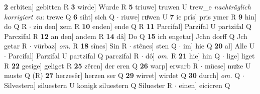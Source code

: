 \documentclass[8pt,a4paper,notitlepage]{article}
\begin{document}
\begin{table}[ht]
\begin{minipage}[t]{0.5\linewidth}
\textbf{2} erbiten] gebitten R \textbf{3} wirde] Wurde R \textbf{5} triuwe] truwen U trew_e \textit{nachträglich korrigiert zu:} trewe Q \textbf{6} siht] sich Q  $\cdot$ riuwe] ruͦwen U \textbf{7} ie prîs] pris ymer R \textbf{9} hin] do Q R  $\cdot$ zin den] zem R \textbf{10} enden] ende Q R \textbf{11} Parcifal] Parzifal U partzifal Q Parczifal R \textbf{12} an den] andem R \textbf{14} dâ] Do Q \textbf{15} ich engetar] Jchn dorff Q Jch getar R  $\cdot$ vürbaz] \textit{om.} R \textbf{18} sînes] Sin R  $\cdot$ stênes] sten Q  $\cdot$ im] hie Q \textbf{20} al] Alle U  $\cdot$ Parcifal] Parzifal U partzifal Q parczifal R  $\cdot$ dô] \textit{om.} R \textbf{21} hie] hin Q  $\cdot$ lige] liget R \textbf{22} gesige] geliget R \textbf{25} zêren] der eren Q \textbf{26} warp] erwarb R  $\cdot$ müese] muͦze U muste Q (R) \textbf{27} herzesêr] herzen ser Q \textbf{29} wirret] wirdet Q \textbf{30} durch] \textit{om.} Q  $\cdot$ Silvestern] siluestern U konigk siluestern Q Siluester R  $\cdot$ einen] eicicren Q \newline
\end{minipage}
\end{table}
\end{document}
